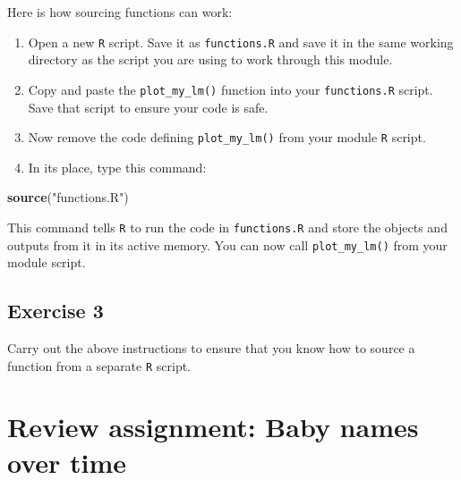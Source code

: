 \documentclass[
]{book}
\newenvironment{Shaded}{\begin{snugshade}}{\end{snugshade}}
\newcommand{\KeywordTok}[1]{\textcolor[rgb]{0.13,0.29,0.53}{\textbf{#1}}}
\newcommand{\NormalTok}[1]{#1}
\newcommand{\StringTok}[1]{\textcolor[rgb]{0.31,0.60,0.02}{#1}}
\begin{document}
Here is how sourcing functions can work:

\begin{enumerate}
\def\labelenumi{\arabic{enumi}.}
\item
  Open a new \texttt{R} script. Save it as \texttt{functions.R} and save it in the same working directory as the script you are using to work through this module.
\item
  Copy and paste the \texttt{plot\_my\_lm()} function into your \texttt{functions.R} script. Save that script to ensure your code is safe.
\item
  Now remove the code defining \texttt{plot\_my\_lm()} from your module \texttt{R} script.
\item
  In its place, type this command:
\end{enumerate}

\begin{Shaded}
\begin{Highlighting}[]
\KeywordTok{source}\NormalTok{(}\StringTok{"functions.R"}\NormalTok{)}
\end{Highlighting}
\end{Shaded}

This command tells \texttt{R} to run the code in \texttt{functions.R} and store the objects and outputs from it in its active memory. You can now call \texttt{plot\_my\_lm()} from your module script.

\hypertarget{exercise-3-2}{%
\subsection*{Exercise 3}\label{exercise-3-2}}

Carry out the above instructions to ensure that you know how to source a function from a separate \texttt{R} script.

\hypertarget{review-assignment-baby-names-over-time}{%
\section*{Review assignment: Baby names over time}\label{review-assignment-baby-names-over-time}}
\end{document}
